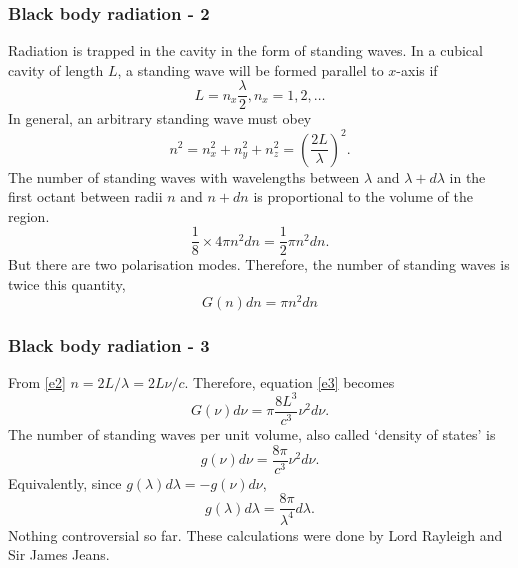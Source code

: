 \documentclass{beamer}
\begin{document}
\begin{frame}
\frametitle{Black body radiation - 2}
Radiation is trapped in the cavity in the form of standing waves. In a cubical
cavity of length $L$, a standing wave will be formed parallel to $x$-axis if
\begin{equation}\label{e1}
L = n_x\frac{\lambda}{2}, n_x = 1, 2, \ldots
\end{equation}
In general, an arbitrary standing wave must obey 
\begin{equation}\label{e2}
n^2 = n_x^2 + n_y^2 + n_z^2 = \left(\frac{2L}{\lambda}\right)^2.
\end{equation}
The number of standing waves with wavelengths between $\lambda$ and $\lambda + 
d\lambda$ in the first octant between radii $n$ and $n + dn$ is proportional to
the volume of the region.
\[
\frac{1}{8} \times 4\pi n^2 dn = \frac{1}{2} \pi n^2 dn.
\]
But there are two polarisation modes. Therefore, the number of standing waves
is twice this quantity,
\begin{equation}\label{e3}
G(n)dn = \pi n^2dn
\end{equation}
\end{frame}

\begin{frame}
\frametitle{Black body radiation - 3}
From \eqref{e2} $n = 2L/\lambda = 2L\nu/c$. Therefore, equation \eqref{e3} 
becomes
\begin{equation}\label{e4}
G(\nu)d\nu = \pi \frac{8L^3}{c^3}\nu^2 d\nu.
\end{equation}
The number of standing waves per unit volume, also called `density of states'
is
\begin{equation}\label{e5}
g(\nu)d\nu = \frac{8\pi}{c^3}\nu^2 d\nu.
\end{equation}
Equivalently, since $g(\lambda)d\lambda = -g(\nu)d\nu$,
\begin{equation}\label{e6}
g(\lambda)d\lambda = \frac{8\pi}{\lambda^4} d\lambda.
\end{equation}
Nothing controversial so far. These calculations were done by Lord Rayleigh
and Sir James Jeans.
\end{frame}
\end{document}
